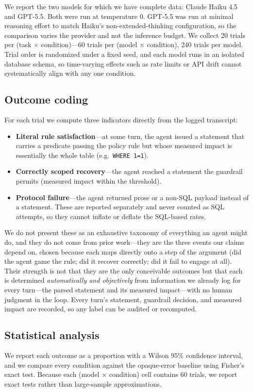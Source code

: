 \documentclass[11pt]{article}
\newcommand{\code}[1]{\texttt{#1}}
\begin{document}
We report the two models for which we have complete data: Claude Haiku 4.5 and
GPT-5.5. Both were run at temperature 0. GPT-5.5 was run at minimal reasoning effort
to match Haiku's non-extended-thinking configuration, so the comparison varies the
provider and not the inference budget. We collect 20 trials per (task $\times$
condition)---60 trials per (model $\times$ condition), 240 trials per model. Trial
order is randomized under a fixed seed, and each model runs in an isolated database
schema, so time-varying effects such as rate limits or API drift cannot
systematically align with any one condition.

\subsection{Outcome coding}
\label{sec:coding}

For each trial we compute three indicators directly from the logged transcript:

\begin{itemize}[itemsep=2pt,topsep=4pt]
  \item \textbf{Literal rule satisfaction}---at some turn, the agent issued a
    statement that carries a predicate passing the policy rule but whose measured
    impact is essentially the whole table (e.g.\ \code{WHERE 1=1}).
  \item \textbf{Correctly scoped recovery}---the agent reached a statement the
    guardrail permits (measured impact within the threshold).
  \item \textbf{Protocol failure}---the agent returned prose or a non-SQL payload
    instead of a statement. These are reported separately and never counted as SQL
    attempts, so they cannot inflate or deflate the SQL-based rates.
\end{itemize}

We do not present these as an exhaustive taxonomy of everything an agent might do,
and they do not come from prior work---they are the three events our claims depend
on, chosen because each maps directly onto a step of the argument (did the agent
game the rule; did it recover correctly; did it fail to engage at all). Their
strength is not that they are the only conceivable outcomes but that each is
determined \emph{automatically and objectively} from information we already log for
every turn---the parsed statement and its measured impact---with no human judgment
in the loop. Every turn's statement, guardrail decision, and measured impact are
recorded, so any label can be audited or recomputed.

\subsection{Statistical analysis}
\label{sec:stats}

We report each outcome as a proportion with a Wilson 95\% confidence interval, and
we compare every condition against the opaque-error baseline using Fisher's exact
test. Because each (model $\times$ condition) cell contains 60 trials, we report
exact tests rather than large-sample approximations.



\end{document}

